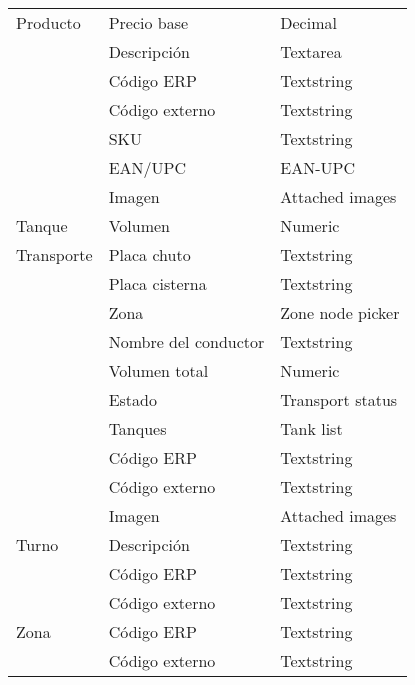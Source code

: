 \begin{center}
\begin{longtable}{ | p{5em} | l | l | }
        Producto
            & Precio base & Decimal \\
            \cline{2-3}
            & Descripción & Textarea \\
            \cline{2-3}
            & Código ERP & Textstring \\
            \cline{2-3}
            & Código externo & Textstring \\
            \cline{2-3}
            & SKU & Textstring \\
            \cline{2-3}
            & EAN/UPC & EAN-UPC \\
            \cline{2-3}
            & Imagen & Attached images \\
        \hline

        Tanque
            & Volumen & Numeric \\
        \hline

        Transporte
            & Placa chuto & Textstring \\
            \cline{2-3}
            & Placa cisterna & Textstring \\
            \cline{2-3}
            & Zona & Zone node picker \\
            \cline{2-3}
            & Nombre del conductor & Textstring \\
            \cline{2-3}
            & Volumen total & Numeric \\
            \cline{2-3}
            & Estado & Transport status \\
            \cline{2-3}
            & Tanques & Tank list \\
            \cline{2-3}
            & Código ERP & Textstring \\
            \cline{2-3}
            & Código externo & Textstring \\
            \cline{2-3}
            & Imagen & Attached images \\
        \hline

        Turno
            & Descripción & Textstring \\
            \cline{2-3}
            & Código ERP & Textstring \\
            \cline{2-3}
            & Código externo & Textstring \\
        \hline

        Zona
            & Código ERP & Textstring \\
            \cline{2-3}
            & Código externo & Textstring \\
        \hline
    \end{longtable}
\end{center}